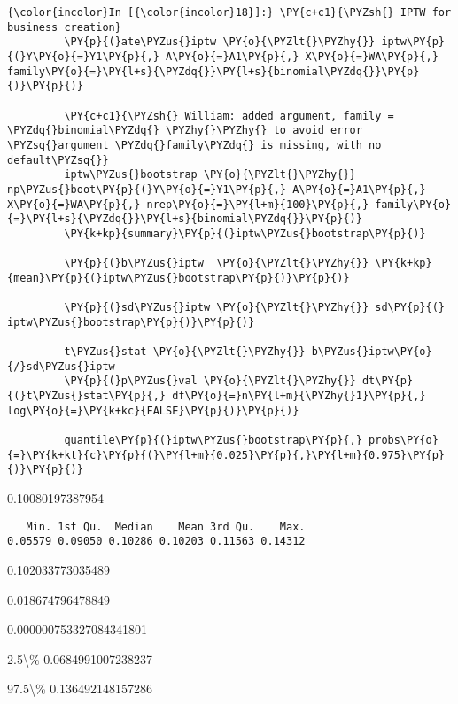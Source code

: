    \begin{Verbatim}[commandchars=\\\{\}]
{\color{incolor}In [{\color{incolor}18}]:} \PY{c+c1}{\PYZsh{} IPTW for business creation}
         \PY{p}{(}ate\PYZus{}iptw \PY{o}{\PYZlt{}\PYZhy{}} iptw\PY{p}{(}Y\PY{o}{=}Y1\PY{p}{,} A\PY{o}{=}A1\PY{p}{,} X\PY{o}{=}WA\PY{p}{,} family\PY{o}{=}\PY{l+s}{\PYZdq{}}\PY{l+s}{binomial\PYZdq{}}\PY{p}{)}\PY{p}{)}
         
         \PY{c+c1}{\PYZsh{} William: added argument, family = \PYZdq{}binomial\PYZdq{} \PYZhy{}\PYZhy{} to avoid error \PYZsq{}argument \PYZdq{}family\PYZdq{} is missing, with no default\PYZsq{}}
         iptw\PYZus{}bootstrap \PY{o}{\PYZlt{}\PYZhy{}} np\PYZus{}boot\PY{p}{(}Y\PY{o}{=}Y1\PY{p}{,} A\PY{o}{=}A1\PY{p}{,} X\PY{o}{=}WA\PY{p}{,} nrep\PY{o}{=}\PY{l+m}{100}\PY{p}{,} family\PY{o}{=}\PY{l+s}{\PYZdq{}}\PY{l+s}{binomial\PYZdq{}}\PY{p}{)} 
         \PY{k+kp}{summary}\PY{p}{(}iptw\PYZus{}bootstrap\PY{p}{)}
         
         \PY{p}{(}b\PYZus{}iptw  \PY{o}{\PYZlt{}\PYZhy{}} \PY{k+kp}{mean}\PY{p}{(}iptw\PYZus{}bootstrap\PY{p}{)}\PY{p}{)}
         
         \PY{p}{(}sd\PYZus{}iptw \PY{o}{\PYZlt{}\PYZhy{}} sd\PY{p}{(}  iptw\PYZus{}bootstrap\PY{p}{)}\PY{p}{)}
         
         t\PYZus{}stat \PY{o}{\PYZlt{}\PYZhy{}} b\PYZus{}iptw\PY{o}{/}sd\PYZus{}iptw
         \PY{p}{(}p\PYZus{}val \PY{o}{\PYZlt{}\PYZhy{}} dt\PY{p}{(}t\PYZus{}stat\PY{p}{,} df\PY{o}{=}n\PY{l+m}{\PYZhy{}1}\PY{p}{,} log\PY{o}{=}\PY{k+kc}{FALSE}\PY{p}{)}\PY{p}{)}
         
         quantile\PY{p}{(}iptw\PYZus{}bootstrap\PY{p}{,} probs\PY{o}{=}\PY{k+kt}{c}\PY{p}{(}\PY{l+m}{0.025}\PY{p}{,}\PY{l+m}{0.975}\PY{p}{)}\PY{p}{)}
\end{Verbatim}


    0.10080197387954

    
    
    \begin{verbatim}
   Min. 1st Qu.  Median    Mean 3rd Qu.    Max. 
0.05579 0.09050 0.10286 0.10203 0.11563 0.14312 
    \end{verbatim}

    
    0.102033773035489

    
    0.018674796478849

    
    0.000000753327084341801

    
    \begin{description*}
\item[2.5\textbackslash{}\%] 0.0684991007238237
\item[97.5\textbackslash{}\%] 0.136492148157286
\end{description*}


